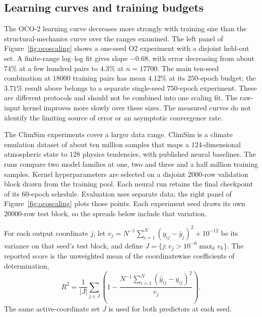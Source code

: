 \subsection{Learning curves and training budgets}
\label{sec:scaling}
The OCO-2 learning curve decreases more strongly with training
size than the structural-mechanics curve over the ranges examined.
The left panel of Figure~\ref{fig:ocoscaling} shows a one-seed O2 experiment
with a disjoint held-out set. A finite-range log--log fit gives slope
$-0.68$, with error decreasing from about $74\%$ at a few hundred pairs to
$4.3\%$ at $n=17700$. The main ten-seed combination at $18000$ training
pairs has mean $4.12\%$ at its $250$-epoch budget; the $3.71\%$ result
above belongs to a separate single-seed $750$-epoch experiment. These are
different protocols and should not be combined into one scaling fit.
The raw-input kernel improves more slowly over these sizes. The measured
curves do not identify the limiting source of error or an asymptotic
convergence rate.

The ClimSim experiments cover a larger data range. ClimSim \citep{yu2023climsim} is a climate emulation dataset of about
ten million samples that maps a $124$-dimensional atmospheric state to $128$
physics tendencies, with published neural baselines. The runs compare two model
families at one, two and three and a half million training samples.
Kernel hyperparameters are selected on a disjoint 2000-row validation
block drawn from the training pool. Each neural run retains the final
checkpoint of its 60-epoch schedule. Evaluation uses separate data; the
right panel of Figure~\ref{fig:ocoscaling} plots those points. Each experiment
seed draws its own $20000$-row test block, so the spreads below include that
variation.

For each output coordinate $j$, let
$v_j=N^{-1}\sum_{i=1}^N(y_{ij}-\bar y_j)^2+10^{-12}$ be its variance
on that seed's test block, and define
$J=\{j:v_j>10^{-6}\max_k v_k\}$. The reported score is the unweighted
mean of the coordinatewise coefficients of determination,
\[
 R^2=\frac{1}{|J|}\sum_{j\in J}
 \left(1-\frac{N^{-1}\sum_{i=1}^N(\hat y_{ij}-y_{ij})^2}{v_j}\right).
\]
The same active-coordinate set $J$ is used for both predictors at each seed.

